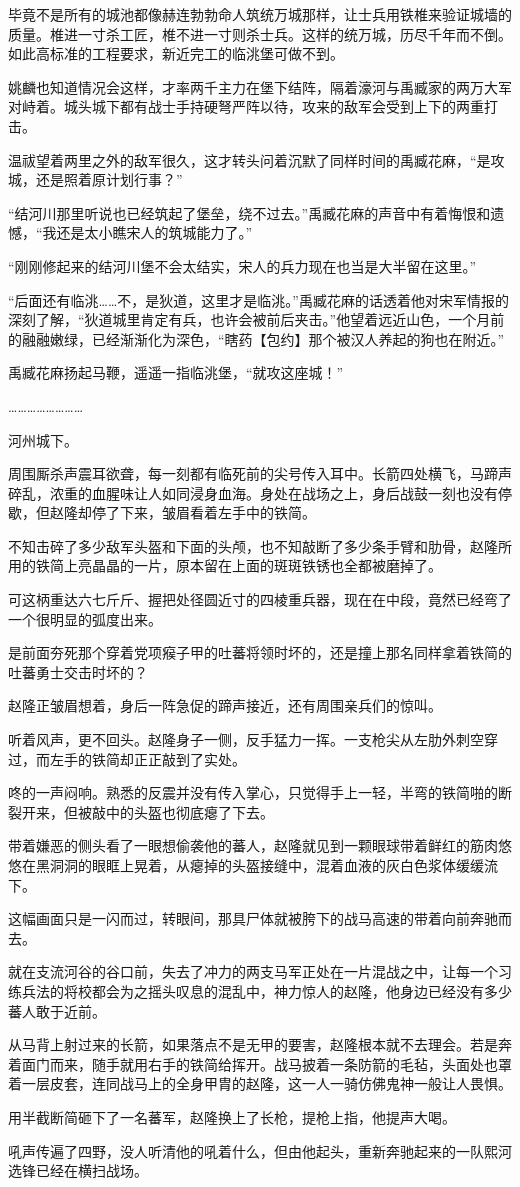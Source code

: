 毕竟不是所有的城池都像赫连勃勃命人筑统万城那样，让士兵用铁椎来验证城墙的质量。椎进一寸杀工匠，椎不进一寸则杀士兵。这样的统万城，历尽千年而不倒。如此高标准的工程要求，新近完工的临洮堡可做不到。

姚麟也知道情况会这样，才率两千主力在堡下结阵，隔着濠河与禹臧家的两万大军对峙着。城头城下都有战士手持硬弩严阵以待，攻来的敌军会受到上下的两重打击。

温祓望着两里之外的敌军很久，这才转头问着沉默了同样时间的禹臧花麻，“是攻城，还是照着原计划行事？”

“结河川那里听说也已经筑起了堡垒，绕不过去。”禹臧花麻的声音中有着悔恨和遗憾，“我还是太小瞧宋人的筑城能力了。”

“刚刚修起来的结河川堡不会太结实，宋人的兵力现在也当是大半留在这里。”

“后面还有临洮……不，是狄道，这里才是临洮。”禹臧花麻的话透着他对宋军情报的深刻了解，“狄道城里肯定有兵，也许会被前后夹击。”他望着远近山色，一个月前的融融嫩绿，已经渐渐化为深色，“瞎药【包约】那个被汉人养起的狗也在附近。”

禹臧花麻扬起马鞭，遥遥一指临洮堡，“就攻这座城！”

……………………

河州城下。

周围厮杀声震耳欲聋，每一刻都有临死前的尖号传入耳中。长箭四处横飞，马蹄声碎乱，浓重的血腥味让人如同浸身血海。身处在战场之上，身后战鼓一刻也没有停歇，但赵隆却停了下来，皱眉看着左手中的铁简。

不知击碎了多少敌军头盔和下面的头颅，也不知敲断了多少条手臂和肋骨，赵隆所用的铁简上亮晶晶的一片，原本留在上面的斑斑铁锈也全都被磨掉了。

可这柄重达六七斤斤、握把处径圆近寸的四棱重兵器，现在在中段，竟然已经弯了一个很明显的弧度出来。

是前面夯死那个穿着党项瘊子甲的吐蕃将领时坏的，还是撞上那名同样拿着铁简的吐蕃勇士交击时坏的？

赵隆正皱眉想着，身后一阵急促的蹄声接近，还有周围亲兵们的惊叫。

听着风声，更不回头。赵隆身子一侧，反手猛力一挥。一支枪尖从左肋外刺空穿过，而左手的铁简却正正敲到了实处。

咚的一声闷响。熟悉的反震并没有传入掌心，只觉得手上一轻，半弯的铁简啪的断裂开来，但被敲中的头盔也彻底瘪了下去。

带着嫌恶的侧头看了一眼想偷袭他的蕃人，赵隆就见到一颗眼球带着鲜红的筋肉悠悠在黑洞洞的眼眶上晃着，从瘪掉的头盔接缝中，混着血液的灰白色浆体缓缓流下。

这幅画面只是一闪而过，转眼间，那具尸体就被胯下的战马高速的带着向前奔驰而去。

就在支流河谷的谷口前，失去了冲力的两支马军正处在一片混战之中，让每一个习练兵法的将校都会为之摇头叹息的混乱中，神力惊人的赵隆，他身边已经没有多少蕃人敢于近前。

从马背上射过来的长箭，如果落点不是无甲的要害，赵隆根本就不去理会。若是奔着面门而来，随手就用右手的铁简给挥开。战马披着一条防箭的毛毡，头面处也罩着一层皮套，连同战马上的全身甲胄的赵隆，这一人一骑仿佛鬼神一般让人畏惧。

用半截断简砸下了一名蕃军，赵隆换上了长枪，提枪上指，他提声大喝。

吼声传遍了四野，没人听清他的吼着什么，但由他起头，重新奔驰起来的一队熙河选锋已经在横扫战场。

